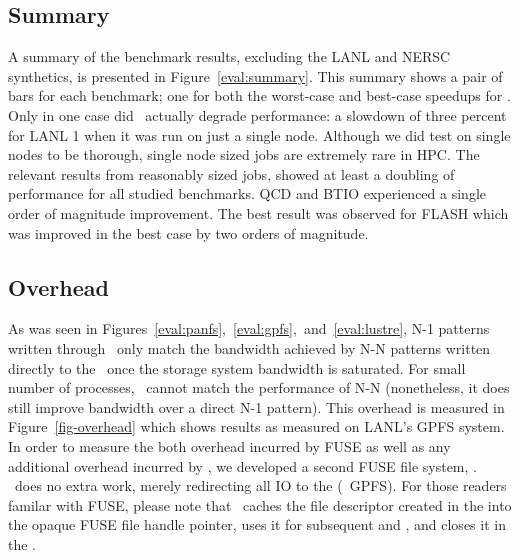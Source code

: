 \subsection{Summary}

A summary of the benchmark results, excluding the LANL and NERSC synthetics, is
presented in Figure~\ref{eval:summary}. This summary shows a pair of bars for
each benchmark; one for both the worst-case and best-case speedups for \plfs.
Only in one case did \plfs\ actually degrade performance: a slowdown of three
percent for LANL 1 when it was run on just a single node. Although we did test
on single nodes to be thorough, single node sized jobs are extremely rare in
HPC. The relevant results from reasonably sized jobs, showed at least a
doubling of performance for all studied benchmarks. QCD and BTIO experienced a
single order of magnitude improvement. The best result was observed for FLASH
which was improved in the best case by two orders of magnitude. 

\subsection{Overhead}
\label{overhead}



As was seen in
Figures~\ref{eval:panfs},~\ref{eval:gpfs},~and~\ref{eval:lustre}, N-1 patterns
written through \plfs\ only match the bandwidth achieved by N-N patterns
written directly to the \upfs\ once the storage system bandwidth is saturated.
For small number of processes, \plfs\ cannot match the performance of N-N
(nonetheless, it does still improve bandwidth over a direct N-1 pattern). This
overhead is measured in Figure~\ref{fig-overhead} which shows results as
measured on LANL's GPFS system. In order to measure the both overhead incurred
by FUSE as well as any additional overhead incurred by \plfs, we developed a
second FUSE file system, \Term{\noopfs}.  \noopfs\ does no extra work, merely
redirecting all IO to the \upfs (\ie\ GPFS). For those readers familar with
FUSE, please note that \noopfs\ caches the file descriptor created in the
 into the opaque FUSE file handle pointer, uses it for subsequent
 and , and closes it in the .

